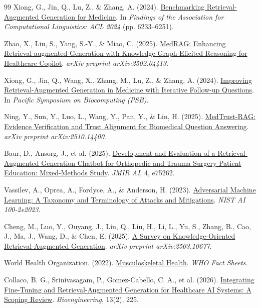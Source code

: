 \begin{thebibliography}{99}
Xiong, G., Jin, Q., Lu, Z., \& Zhang, A. (2024).
\href{https://aclanthology.org/2024.findings-acl.372/}{Benchmarking Retrieval-Augmented Generation for Medicine}.
In \textit{Findings of the Association for Computational Linguistics: ACL 2024} (pp. 6233--6251).

Zhao, X., Liu, S., Yang, S.-Y., \& Miao, C. (2025).
\href{https://arxiv.org/abs/2502.04413}{MedRAG: Enhancing Retrieval-augmented Generation with Knowledge Graph-Elicited Reasoning for Healthcare Copilot}.
\textit{arXiv preprint arXiv:2502.04413}.

Xiong, G., Jin, Q., Wang, X., Zhang, M., Lu, Z., \& Zhang, A. (2024).
\href{https://arxiv.org/abs/2408.00727}{Improving Retrieval-Augmented Generation in Medicine with Iterative Follow-up Questions}.
In \textit{Pacific Symposium on Biocomputing (PSB)}.

Ning, Y., Sun, Y., Luo, L., Wang, Y., Pan, Y., \& Lin, H. (2025).
\href{https://arxiv.org/abs/2510.14400}{MedTrust-RAG: Evidence Verification and Trust Alignment for Biomedical Question Answering}.
\textit{arXiv preprint arXiv:2510.14400}.

Baur, D., Ansorg, J., et al. (2025).
\href{https://doi.org/10.2196/75262}{Development and Evaluation of a Retrieval-Augmented Generation Chatbot for Orthopedic and Trauma Surgery Patient Education: Mixed-Methods Study}.
\textit{JMIR AI}, 4, e75262.

Vassilev, A., Oprea, A., Fordyce, A., \& Anderson, H. (2023).
\href{https://nvlpubs.nist.gov/nistpubs/ai/NIST.AI.100-2e2023.pdf}{Adversarial Machine Learning: A Taxonomy and Terminology of Attacks and Mitigations}.
\textit{NIST AI 100-2e2023}.

Cheng, M., Luo, Y., Ouyang, J., Liu, Q., Liu, H., Li, L., Yu, S., Zhang, B., Cao, J., Ma, J., Wang, D., \& Chen, E. (2025).
\href{https://arxiv.org/abs/2503.10677}{A Survey on Knowledge-Oriented Retrieval-Augmented Generation}.
\textit{arXiv preprint arXiv:2503.10677}.

World Health Organization. (2022).
\href{https://www.who.int/news-room/fact-sheets/detail/musculoskeletal-conditions}{Musculoskeletal Health}.
\textit{WHO Fact Sheets}.

Collaco, B. G., Srinivasagam, P., Gomez-Cabello, C. A., et al. (2026).
\href{https://doi.org/10.3390/bioengineering13020225}{Integrating Fine-Tuning and Retrieval-Augmented Generation for Healthcare AI Systems: A Scoping Review}.
\textit{Bioengineering}, 13(2), 225.


\end{thebibliography}
